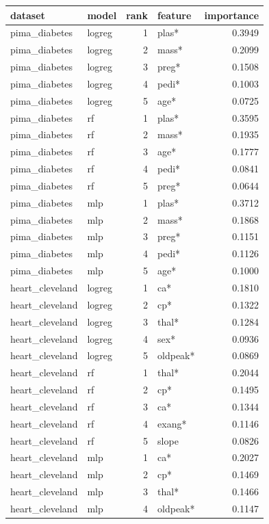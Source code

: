 \begin{tabular}{llrlr}
\toprule
dataset & model & rank & feature & importance \\
\midrule
pima\_diabetes & logreg & 1 & plas* & 0.3949 \\
pima\_diabetes & logreg & 2 & mass* & 0.2099 \\
pima\_diabetes & logreg & 3 & preg* & 0.1508 \\
pima\_diabetes & logreg & 4 & pedi* & 0.1003 \\
pima\_diabetes & logreg & 5 & age* & 0.0725 \\
pima\_diabetes & rf & 1 & plas* & 0.3595 \\
pima\_diabetes & rf & 2 & mass* & 0.1935 \\
pima\_diabetes & rf & 3 & age* & 0.1777 \\
pima\_diabetes & rf & 4 & pedi* & 0.0841 \\
pima\_diabetes & rf & 5 & preg* & 0.0644 \\
pima\_diabetes & mlp & 1 & plas* & 0.3712 \\
pima\_diabetes & mlp & 2 & mass* & 0.1868 \\
pima\_diabetes & mlp & 3 & preg* & 0.1151 \\
pima\_diabetes & mlp & 4 & pedi* & 0.1126 \\
pima\_diabetes & mlp & 5 & age* & 0.1000 \\
heart\_cleveland & logreg & 1 & ca* & 0.1810 \\
heart\_cleveland & logreg & 2 & cp* & 0.1322 \\
heart\_cleveland & logreg & 3 & thal* & 0.1284 \\
heart\_cleveland & logreg & 4 & sex* & 0.0936 \\
heart\_cleveland & logreg & 5 & oldpeak* & 0.0869 \\
heart\_cleveland & rf & 1 & thal* & 0.2044 \\
heart\_cleveland & rf & 2 & cp* & 0.1495 \\
heart\_cleveland & rf & 3 & ca* & 0.1344 \\
heart\_cleveland & rf & 4 & exang* & 0.1146 \\
heart\_cleveland & rf & 5 & slope & 0.0826 \\
heart\_cleveland & mlp & 1 & ca* & 0.2027 \\
heart\_cleveland & mlp & 2 & cp* & 0.1469 \\
heart\_cleveland & mlp & 3 & thal* & 0.1466 \\
heart\_cleveland & mlp & 4 & oldpeak* & 0.1147 \\

\end{tabular}
